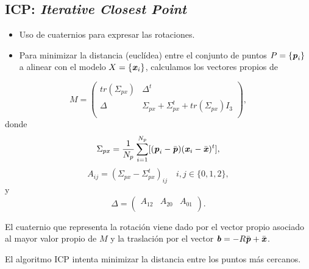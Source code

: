\documentclass[9pt]{beamer}
\newcommand{\xx}{\textbf{\emph{x}}}
\newcommand{\pp}{\textbf{\emph{p}}}
\newcommand{\bb}{\textbf{\emph{b}}}
\begin{document}
	\subsection{ICP: \textit{Iterative Closest Point}}
	\begin{frame}
		\begin{itemize}
			\item Uso de cuaternios para expresar las rotaciones. 
			\item Para minimizar la distancia (euclídea) entre el conjunto de puntos $ P = \{\pp_i\}$ a alinear con el modelo $ X = \{\xx_i\} $, calculamos los vectores propios de 
		\end{itemize}
	
		\begin{equation}\label{matCov}
		M  =
		\begin{pmatrix}
		tr(\Sigma_{px}) & \Delta^t \\
		\Delta & \Sigma_{px} + \Sigma_{px}^t + tr(\Sigma_{px})I_3\\
		\end{pmatrix}, 
		\end{equation}
		donde 
		\[
		\Sigma_{px} = \frac{1}{N_p}\sum_{i=1}^{N_p} \lbrack (\pp_i-\bar{\pp})(\xx_i - \bar{\xx})^t\rbrack, \]
		\[A_{ij} = (\Sigma_{px}-\Sigma_{px}^t)_{ij} \quad i,j \in \lbrace 0,1,2 \rbrace,\]
		y 
		\[\Delta = \begin{pmatrix}
		A_{12} & A_{20} & A_{01}  \\
		\end{pmatrix}. \]
		
		El cuaternio que representa la rotación viene dado por el vector propio asociado al mayor valor propio de $ M $ y la traslación por el vector $ \bb = -R\bar{\pp}  + \bar{\xx} $. 
		
		El algoritmo ICP intenta minimizar la distancia entre los puntos más cercanos.
	
	\end{frame}
\end{document}
